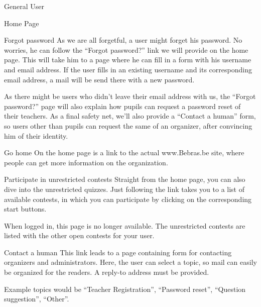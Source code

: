 \begin{section}{General User}
\begin{subsection}{Home Page}
        \begin{subsubsection}{Forgot password}
            As we are all forgetful, a user might forget his password. No
            worries, he can follow the ``Forgot password?'' link we will provide
            on the home page. This will take him to a page where he can fill in
            a form with his username and email address. If the user fills in an
            existing username and its corresponding email address, a mail will
            be send there with a new password.

            As there might be users who didn't leave their email address with
            us, the ``Forgot password?'' page will also explain how pupils can
            request a password reset of their teachers. As a final safety net,
            we'll also provide a ``Contact a human'' form, so users other than
            pupils can request the same of an organizer, after convincing him of
            their identity.
        \end{subsubsection}

        \begin{subsubsection}{Go home}
            On the home page is a link to the actual www.Bebras.be site, where
            people can get more information on the organization.
        \end{subsubsection}

        \begin{subsubsection}{Participate in unrestricted contests}
            Straight from the home page, you can also dive into the unrestricted
            quizzes. Just following the link takes you to a list of available
            contests, in which you can participate by clicking on the
            corresponding start buttons.

            When logged in, this page is no longer available. The unrestricted
            contests are listed with the other open contests for your user.
        \end{subsubsection}

        \begin{subsubsection}{Contact a human}
            This link leads to a page containing form for contacting organizers
            and administrators. Here, the user can select a topic, so mail can
            easily be organized for the readers. A reply-to address must be
            provided.

            Example topics would be ``Teacher Registration'', ``Password
            reset'', ``Question suggestion'', ``Other''.
        \end{subsubsection}


\end{subsection}
\end{section}
